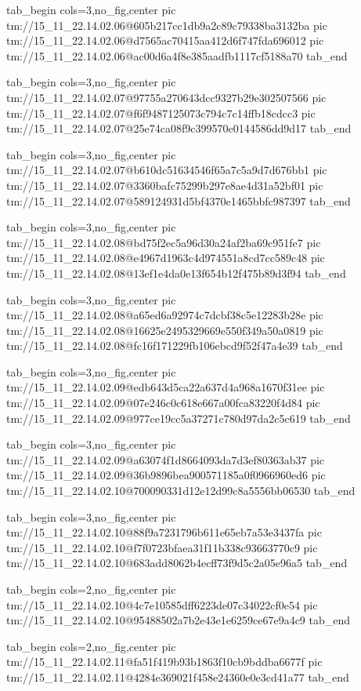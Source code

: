  
 
 
 
 

\qqSecCmtScr


\ifcmt
  tab_begin cols=3,no_fig,center
    pic tm://15_11_22.14.02.06@605b217cc1db9a2c89c79338ba3132ba
    pic tm://15_11_22.14.02.06@d7565ac70415aa412d6f747fda696012
    pic tm://15_11_22.14.02.06@ac00d6a4f8e385aadfb1117cf5188a70
  tab_end
\fi


\ifcmt
  tab_begin cols=3,no_fig,center
    pic tm://15_11_22.14.02.07@97755a270643dcc9327b29e302507566
    pic tm://15_11_22.14.02.07@f6f9487125073c794c7c14ffb18cdcc3
    pic tm://15_11_22.14.02.07@25e74ca08f9c399570e0144586dd9d17
  tab_end
\fi


\ifcmt
  tab_begin cols=3,no_fig,center
    pic tm://15_11_22.14.02.07@b610dc51634546f65a7c5a9d7d676bb1
    pic tm://15_11_22.14.02.07@3360bafc75299b297e8ae4d31a52bf01
    pic tm://15_11_22.14.02.07@589124931d5bf4370e1465bbfc987397
  tab_end
\fi


\ifcmt
  tab_begin cols=3,no_fig,center
    pic tm://15_11_22.14.02.08@bd75f2ec5a96d30a24af2ba69c951fe7
    pic tm://15_11_22.14.02.08@e4967d1963c4d974551a8cd7cc589c48
    pic tm://15_11_22.14.02.08@13ef1e4da0e13f654b12f475b89d3f94
  tab_end
\fi


\ifcmt
  tab_begin cols=3,no_fig,center
    pic tm://15_11_22.14.02.08@a65ed6a92974c7dcbf38c5e12283b28e
    pic tm://15_11_22.14.02.08@16625e2495329669e550f349a50a0819
    pic tm://15_11_22.14.02.08@fc16f171229fb106ebcd9f52f47a4e39
  tab_end
\fi


\ifcmt
  tab_begin cols=3,no_fig,center
    pic tm://15_11_22.14.02.09@edb643d5ca22a637d4a968a1670f31ee
    pic tm://15_11_22.14.02.09@07e246c0c618e667a00fca83220f4d84
    pic tm://15_11_22.14.02.09@977ce19cc5a37271c780d97da2c5c619
  tab_end
\fi


\ifcmt
  tab_begin cols=3,no_fig,center
    pic tm://15_11_22.14.02.09@a63074f1d8664093da7d3ef80363ab37
    pic tm://15_11_22.14.02.09@36b9896bea900571185a0f0966960ed6
    pic tm://15_11_22.14.02.10@700090331d12e12d99c8a5556bb06530
  tab_end
\fi


\ifcmt
  tab_begin cols=3,no_fig,center
    pic tm://15_11_22.14.02.10@88f9a7231796b611e65eb7a53e3437fa
    pic tm://15_11_22.14.02.10@f7f0723bfaea31f11b338c93663770c9
    pic tm://15_11_22.14.02.10@683add8062b4ecff73f9d5c2a05e96a5
  tab_end
\fi


\ifcmt
  tab_begin cols=2,no_fig,center
    pic tm://15_11_22.14.02.10@4c7e10585dff6223de07c34022cf0e54
    pic tm://15_11_22.14.02.10@95488502a7b2e43e1e6259ce67e9a4c9
  tab_end
\fi


\ifcmt
  tab_begin cols=2,no_fig,center
    pic tm://15_11_22.14.02.11@fa51f419b93b1863f10cb9bddba6677f
    pic tm://15_11_22.14.02.11@4284e369021f458e24360e0e3cd41a77
  tab_end
\fi

